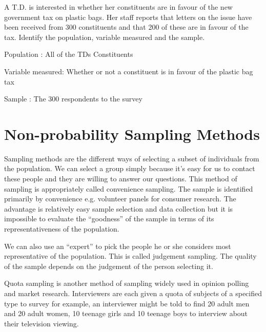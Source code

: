 ﻿\documentclass[]{report}
\begin{document}
A T.D. is interested in whether her constituents are in favour of the new government tax on plastic bags. Her staff reports that letters on the issue have been received from 300 constituents and that 200 of these are in favour of the tax. Identify the population, variable measured and the sample. 





Population : All of the TDs Constituents

Variable measured: Whether or not a constituent is in favour of the plastic bag tax

Sample : The 300 respondents to the survey








\section{Non-probability Sampling Methods}
Sampling methods are the different ways of selecting a subset of individuals from the population. We can select a group simply because it’s easy for us to contact these people and they are willing to answer our questions. This method of sampling is appropriately called convenience sampling. The sample is identified primarily by convenience e.g. volunteer panels for consumer research. The advantage is relatively easy sample selection and data collection but it is impossible to evaluate the “goodness” of the sample in terms of its representativeness of the population.

We can also use an “expert” to pick the people he or she considers most representative of the population. This is called judgement sampling. The quality of the sample depends on the judgement of the person selecting it.


Quota sampling is another method of sampling widely used in opinion polling and market research. Interviewers are each given a quota of subjects of a specified type to survey for example, an interviewer might be told to find 20 adult men and 20 adult women, 10 teenage girls and 10 teenage boys to interview about their television viewing. 
\end{document}
